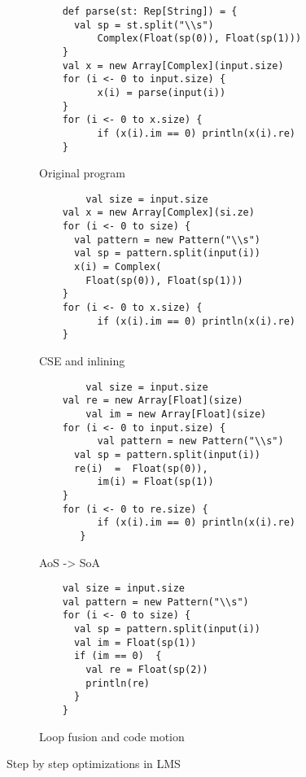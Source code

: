 \begin{figure*}
  \begin{subfigure}[b]{.5\linewidth}
    \begin{lstlisting}
  	def parse(st: Rep[String]) = {               
	  val sp = st.split("\\s")
          Complex(Float(sp(0)), Float(sp(1)))
	}
	val x = new Array[Complex](input.size)
	for (i <- 0 to input.size) {
     	  x(i) = parse(input(i)) 
	}
	for (i <- 0 to x.size) {
    	  if (x(i).im == 0) println(x(i).re) 
	}
    \end{lstlisting}
    \caption{Original program}
    \label{lst:original}
  \end{subfigure}
  \begin{subfigure}[b]{.5\linewidth}
    \begin{lstlisting}
        val size = input.size
	val x = new Array[Complex](si.ze)
	for (i <- 0 to size) {
   	  val pattern = new Pattern("\\s") 
	  val sp = pattern.split(input(i))
	  x(i) = Complex(
	    Float(sp(0)), Float(sp(1))) 
	}
	for (i <- 0 to x.size) {
          if (x(i).im == 0) println(x(i).re) 
	}
    \end{lstlisting}
    \caption{CSE and inlining}
  \end{subfigure}
  \begin{subfigure}[b]{.5\linewidth}
    \begin{lstlisting}
        val size = input.size
	val re = new Array[Float](size)
        val im = new Array[Float](size)
	for (i <- 0 to input.size) {
          val pattern = new Pattern("\\s") 
   	  val sp = pattern.split(input(i))
	  re(i)  =  Float(sp(0)),
          im(i) = Float(sp(1)) 
	}
	for (i <- 0 to re.size) {
          if (x(i).im == 0) println(x(i).re) 
       }
    \end{lstlisting}
    \label{lst:aos-soa}
    \caption{AoS -> SoA}
  \end{subfigure}
\begin{subfigure}[b]{.5\linewidth}
    \begin{lstlisting}
	val size = input.size
	val pattern = new Pattern("\\s") 
	for (i <- 0 to size) {
	  val sp = pattern.split(input(i))
 	  val im = Float(sp(1))
	  if (im == 0)  {
	    val re = Float(sp(2))
 	    println(re) 
   	  }
	}
    \end{lstlisting}
    \caption{Loop fusion and code motion}
    \label{lst:fusion-motion}
  \end{subfigure}
  \caption{Step by step optimizations in LMS}
  \label{lst:step-by-step-lms}
\end{figure*}
